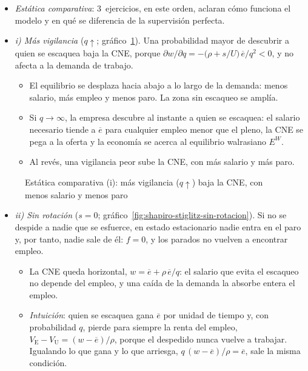 \documentclass[11pt]{article}
\begin{document}
\begin{itemize}
\item \emph{Estática comparativa}: 3~ejercicios, en este orden, aclaran cómo funciona el modelo y en qué se diferencia de la supervisión perfecta.
\item \emph{i) Más vigilancia} ($q\uparrow$; gráfico~\ref{fig:shapiro-stiglitz-vigilancia}). Una probabilidad mayor de descubrir a quien se escaquea baja la CNE, porque $\partial w/\partial q=-\big(\rho+s/U\big)\,\overline{e}/q^2<0$, y no afecta a la demanda de trabajo.
  \begin{itemize}
  \item El equilibrio se desplaza hacia abajo a lo largo de la demanda: menos salario, más empleo y menos paro. La zona sin escaqueo se amplía.
  \item Si $q\to\infty$, la empresa descubre al instante a quien se escaquea: el salario necesario tiende a $\overline{e}$ para cualquier empleo menor que el pleno, la CNE se pega a la oferta y la economía se acerca al equilibrio walrasiano $E^W$.
  \item Al revés, una vigilancia peor sube la CNE, con más salario y más paro\nocite{ShapiroStiglitz1984Equilibrium}.
  \end{itemize}
\end{itemize}

\begin{figure}[H]
\centering
\caption{Estática comparativa (i): más vigilancia ($q\uparrow$) baja la CNE, con menos salario y menos paro}\label{fig:shapiro-stiglitz-vigilancia}
\end{figure}

\begin{itemize}
\item \emph{ii) Sin rotación} ($s=0$; gráfico~\ref{fig:shapiro-stiglitz-sin-rotacion}). Si no se despide a nadie que se esfuerce, en estado estacionario nadie entra en el paro y, por tanto, nadie sale de él: $f=0$, y los parados no vuelven a encontrar empleo.
  \begin{itemize}
  \item La CNE queda horizontal, $w=\overline{e}+\rho\,\overline{e}/q$: el salario que evita el escaqueo no depende del empleo, y una caída de la demanda la absorbe entera el empleo.
  \item \emph{Intuición}: quien se escaquea gana $\overline{e}$ por unidad de tiempo y, con probabilidad $q$, pierde para siempre la renta del empleo, $V_{\mathrm E}-V_{\mathrm U}=(w-\overline{e})/\rho$, porque el despedido nunca vuelve a trabajar. Igualando lo que gana y lo que arriesga, $q\,(w-\overline{e})/\rho=\overline{e}$, sale la misma condición.\findemo
  \end{itemize}
\end{itemize}
\end{document}
